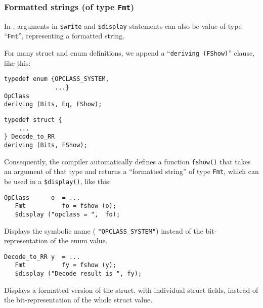 \begin{frame}[fragile]
\frametitle{Formatted strings (of type {\tt Fmt})}

\footnotesize

In {\BSV}, arguments in {\tt \$write} and {\tt \$display} statements
can also be value of type ``{\tt Fmt}'', representing a formatted
string.

\vx

For many struct and enum definitions, we append a ``{\tt deriving
(FShow)}'' clause, like this:

\vx

\begin{center}
\begin{minipage}{0.4\textwidth}
\begin{Verbatim}[frame=single]
typedef enum {OPCLASS_SYSTEM,
              ...}
OpClass
deriving (Bits, Eq, FShow);
\end{Verbatim}
\end{minipage}
\hmmmm
\begin{minipage}{0.4\textwidth}
\begin{Verbatim}[frame=single]
typedef struct {
    ...
} Decode_to_RR
deriving (Bits, FShow);
\end{Verbatim}
\end{minipage}
\end{center}

\PAUSE{\vx}

Consequently, the {\bsc} compiler automatically defines a function
{\tt fshow()} that takes an argument of that type and returns a
``formatted string'' of type {\tt Fmt}, which can be used in a
{\tt \$display()}, like this:

\vx

\begin{center}
\begin{minipage}{0.4\textwidth}
\begin{Verbatim}[frame=single]
   OpClass      o  = ...
   Fmt          fo = fshow (o);
   $display ("opclass = ",  fo);
\end{Verbatim}

Displays the symbolic name ({\eg} {\tt "OPCLASS\_SYSTEM"}) instead of
the bit-representation of the enum value.

\end{minipage}
\hmmmm
\begin{minipage}{0.4\textwidth}
\begin{Verbatim}[frame=single]
   Decode_to_RR y  = ...
   Fmt          fy = fshow (y);
   $display ("Decode result is ", fy);
\end{Verbatim}

Displays a formatted version of the struct, with individual struct
fields, instead of the bit-representation of the whole struct value.

\end{minipage}

\end{center}

\end{frame}

